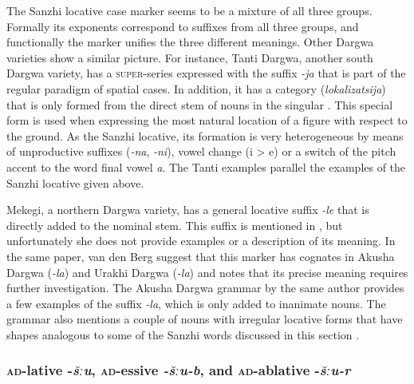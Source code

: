 The Sanzhi locative case marker seems to be a mixture of all three groups. Formally its exponents correspond to suffixes from all three groups, and functionally the marker unifies the three different meanings. Other Dargwa varieties show a similar picture. For instance, Tanti Dargwa, another south Dargwa variety, has a \textsc{super}-series expressed with the suffix \textit{-ja} that is part of the regular paradigm of spatial cases. In addition, it has a category  (\textit{lokalizatsija}) that is only formed from the direct stem of nouns in the singular \citep[66]{Sumbatova.Lander2014}. This special form is used when expressing the most natural location of a figure with respect to the ground. As the Sanzhi locative, its formation is very heterogeneous by means of unproductive suffixes (\textit{-na}, \textit{-ni}), vowel change (i > e) or a switch of the pitch accent to the word final vowel \textit{a}. The Tanti examples parallel the examples of the Sanzhi locative given above.

Mekegi, a northern Dargwa variety, has a general locative suffix \textit{-le} that is directly added to the nominal stem. This suffix is mentioned in , but unfortunately she does not provide examples or a description of its meaning. In the same paper, van den Berg suggest that this marker has cognates in Akusha Dargwa (\textit{-la}) and Urakhi Dargwa (\textit{-la}) and notes that its precise meaning requires further investigation. The Akusha Dargwa grammar by the same author provides a few examples of the suffix \textit{-la}, which is only added to inanimate nouns. The grammar also mentions a couple of nouns with irregular locative forms that have shapes analogous to some of the Sanzhi words discussed in this section \citep[24]{vandenBerg2003c}.




\subsubsection{\textsc{ad}-lative -\textit{šːu}, \textsc{ad}-essive \textit{-šːu-b}, and \textsc{ad}-ablative -\textit{šːu-r}}
\label{sssec:ad-lative -šːu, ad-essive -šːu-b, and ad-ablative -šːu-r}

